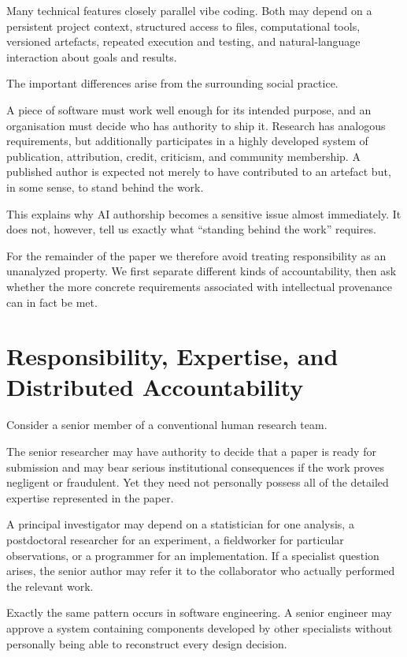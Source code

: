 Many technical features closely parallel vibe coding. Both may depend on a persistent project context, structured access to files, computational tools, versioned artefacts, repeated execution and testing, and natural-language interaction about goals and results.

The important differences arise from the surrounding social practice.

A piece of software must work well enough for its intended purpose, and an organisation must decide who has authority to ship it. Research has analogous requirements, but additionally participates in a highly developed system of publication, attribution, credit, criticism, and community membership. A published author is expected not merely to have contributed to an artefact but, in some sense, to stand behind the work.

This explains why AI authorship becomes a sensitive issue almost immediately. It does not, however, tell us exactly what ``standing behind the work'' requires.

For the remainder of the paper we therefore avoid treating responsibility as an unanalyzed property. We first separate different kinds of accountability, then ask whether the more concrete requirements associated with intellectual provenance can in fact be met.


\section{Responsibility, Expertise, and Distributed Accountability}

Consider a senior member of a conventional human research team.

The senior researcher may have authority to decide that a paper is ready for submission and may bear serious institutional consequences if the work proves negligent or fraudulent. Yet they need not personally possess all of the detailed expertise represented in the paper.

A principal investigator may depend on a statistician for one analysis, a postdoctoral researcher for an experiment, a fieldworker for particular observations, or a programmer for an implementation. If a specialist question arises, the senior author may refer it to the collaborator who actually performed the relevant work.

Exactly the same pattern occurs in software engineering. A senior engineer may approve a system containing components developed by other specialists without personally being able to reconstruct every design decision.


